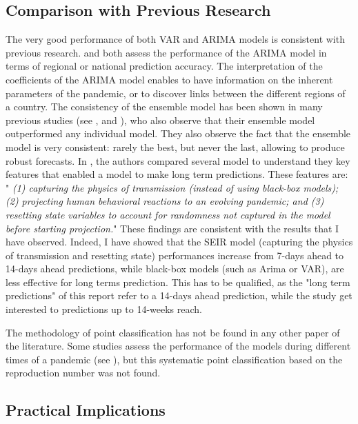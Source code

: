  



\subsection{Comparison with Previous Research}

The very good performance of both VAR and ARIMA models is consistent with previous research. 
\cite{kufel2020arima} and \cite{shang2021regional} both assess the performance of the ARIMA model in terms of regional or national prediction accuracy. 
The interpretation of the coefficients of the ARIMA model enables to have information on the inherent parameters of the pandemic, or to discover links between the different regions of a country. 
The consistency of the ensemble model has been shown in many previous studies (see \cite{cramer2022evaluation}, \cite{VIBOUD201813} and \cite{reich2019accuracy}), who also observe that their ensemble model outperformed any individual model. 
They also observe the fact that the ensemble model is very consistent: rarely the best, but never the last, allowing to produce robust forecasts. 
In \cite{rahmandad2022enhancing}, the authors compared several model to understand they key features that enabled a model to make long term predictions. 
These features are: " \textit{(1) capturing the physics of transmission (instead of using black-box models); (2) projecting human behavioral reactions to an evolving pandemic; and (3) resetting state variables to account for randomness not captured in the model before starting projection.}"
These findings are consistent with the results that I have observed. 
Indeed, I have showed that the SEIR model (capturing the physics of transmission and resetting state) performances increase from 7-days ahead to 14-days ahead predictions, while black-box models (such as Arima or VAR), are less effective for long terms prediction. 
This has to be qualified, as the "long term predictions" of this report refer to a 14-days ahead prediction, while the study \cite{rahmandad2022enhancing} get interested to predictions up to 14-weeks reach. 

The methodology of point classification has not be found in any other paper of the literature. 
Some studies assess the performance of the models during different times of a pandemic (see \cite{howerton2023evaluation}), but this systematic point classification based on the reproduction number was not found. 

\subsection{Practical Implications}

